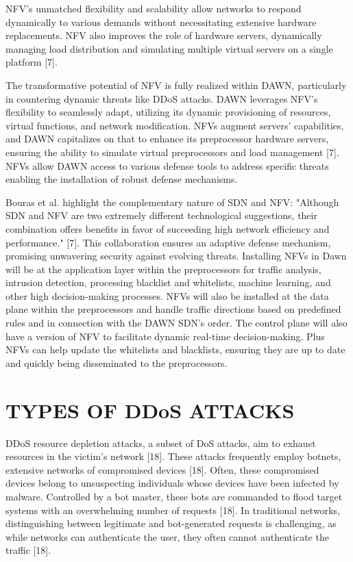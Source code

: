 \documentclass[conference]{IEEEtran}
\begin{document}
NFV's unmatched flexibility and scalability allow networks to respond dynamically to various demands without necessitating extensive hardware replacements. NFV also improves the role of hardware servers, dynamically managing load distribution and simulating multiple virtual servers on a single platform [7]. 

The transformative potential of NFV is fully realized within DAWN, particularly in countering dynamic threats like DDoS attacks. DAWN leverages NFV's flexibility to seamlessly adapt, utilizing its dynamic provisioning of resources, virtual functions, and network modification. NFVs augment servers' capabilities, and DAWN capitalizes on that to enhance its preprocessor hardware servers, ensuring the ability to simulate virtual preprocessors and load management [7]. NFVs allow DAWN access to various defense tools to address specific threats enabling the installation of robust defense mechanisms. 

Bouras et al. highlight the complementary nature of SDN and NFV: "Although SDN and NFV are two extremely different technological suggestions, their combination offers benefits in favor of succeeding high network efficiency and performance." [7]. This collaboration ensures an adaptive defense mechanism, promising unwavering security against evolving threats.
Installing NFVs in Dawn will be at the application layer within the preprocessors for traffic analysis, intrusion detection, processing blacklist and whitelists, machine learning, and other high decision-making processes. NFVs will also be installed at the data plane within the preprocessors and handle traffic directions based on predefined rules and in connection with the DAWN SDN's order. The control plane will also have a version of NFV to facilitate dynamic real-time decision-making. Plus NFVs can help update the whitelists and blacklists, ensuring they are up to date and quickly being disseminated to the preprocessors.

\section{TYPES OF DDoS ATTACKS}

DDoS resource depletion attacks, a subset of DoS attacks, aim to exhaust resources in the victim's network [18]. These attacks frequently employ botnets, extensive networks of compromised devices [18]. Often, these compromised devices belong to unsuspecting individuals whose devices have been infected by malware. Controlled by a bot master, these bots are commanded to flood target systems with an overwhelming number of requests [18]. In traditional networks, distinguishing between legitimate and bot-generated requests is challenging, as while networks can authenticate the user, they often cannot authenticate the traffic [18].
\end{document}
